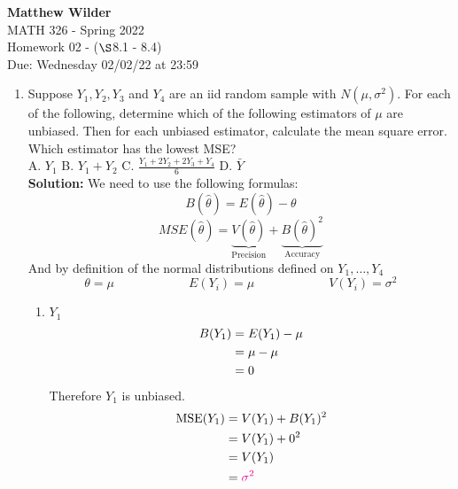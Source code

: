 \documentclass[12pt]{article}
\newcommand{\ybar}{\bar{Y}}
\begin{document}
\pagestyle{fancy}
\fancyhf{}

\noindent \textbf{Matthew Wilder}\\MATH 326 - Spring 2022 \\
Homework 02 - ($\S$8.1 - 8.4)\\
Due: Wednesday 02/02/22 at 23:59\\

\begin{enumerate}
    \item Suppose $Y_1, Y_2, Y_3$ and $Y_4$ are an iid random sample with $N(\mu,\sigma^2)$. For each of the following, determine which of the following estimators of $\mu$ are unbiased. Then for each unbiased estimator, calculate the mean square error. Which estimator has the lowest MSE?
    \vspace{0.25in}\\
    A. $Y_1$ \hspace{0.5in} B. $Y_1 + Y_2$ \hspace{0.8in} C. $\frac{Y_1 + 2Y_2 + 2Y_3 + Y_4}{6}$ \hspace{0.8in} D. $\ybar$
    \vspace{0.3in}\\
    \textbf{Solution:} We need to use the following formulas:
    $$B(\hat{\theta}) = E(\hat{\theta}) - \theta$$
    $$MSE(\hat{\theta}) = \underbrace{V(\hat{\theta})}_{\text{Precision}} + \underbrace{B(\hat{\theta})^2}_{\text{Accuracy}}$$
    And by definition of the normal distributions defined on $Y_1, \dots, Y_4$
    $$\theta = \mu \hspace{1in} E(Y_i) = \mu \hspace{1in} V(Y_i) = \sigma^2$$
    \begin{enumerate}[label=\textbf{\Alph*}.)]
        \item $Y_1$
        \begin{align}
            B(Y_1) &= E(Y_1) - \mu \notag\\ &= \mu - \mu \notag\\ &= 0\notag
        \end{align}
        Therefore $Y_1$ is unbiased.
        \begin{align}
            \operatorname{MSE}(Y_1) &= V(Y_1) + B(Y_1)^2 \notag\\ &= V(Y_1) + 0^2 \notag\\ &= V(Y_1) \notag\\ &= \color{magenta} \sigma^2\notag
        \end{align}
        

\end{enumerate}
\end{enumerate}
\end{document}
